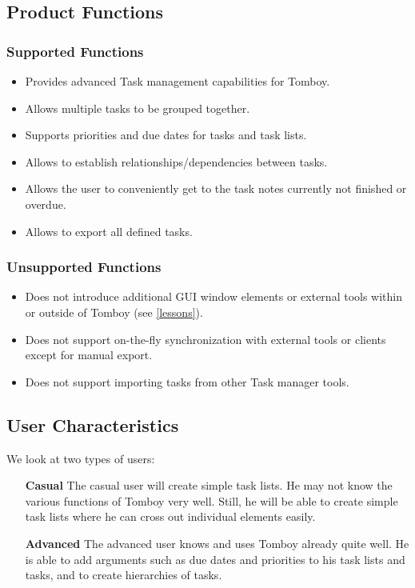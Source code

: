 \subsection{Product Functions}
\label{description:functions}

  \subsubsection*{Supported Functions}
  \label{description:functions:supported}

    \begin{itemize}
      \item Provides advanced Task management capabilities for Tomboy.
      \item Allows multiple tasks to be grouped together.
      \item Supports priorities and due dates for tasks and task lists.
      \item Allows to establish relationships/dependencies between tasks.
      \item Allows the user to conveniently get to the task notes currently not finished or overdue.
      \item Allows to export all defined tasks.
    \end{itemize}

    \subsubsection*{Unsupported Functions}
      \label{description:functions:unsupported}
      \begin{itemize}
        \item Does not introduce additional GUI window elements or external tools within or outside of Tomboy (see \ref{lessons}).
        \item Does not support on-the-fly synchronization with external tools or clients except for manual export.
        \item Does not support importing tasks from other Task manager tools.
      \end{itemize}

\subsection{User Characteristics}
\label{description:usercharacteristics}
We look at two types of users:

  \begin{itemize}
    \item[\bf{Casual}] The casual user will create simple task lists. He may not know the various functions of Tomboy very well. Still, he will be able to create simple task lists where he can cross out individual elements easily. 

    \item[\bf{Advanced}] The advanced user knows and uses Tomboy already quite well. He is able to add arguments such as due dates and priorities to his task lists and tasks, and to create hierarchies of tasks. 

  \end{itemize}


